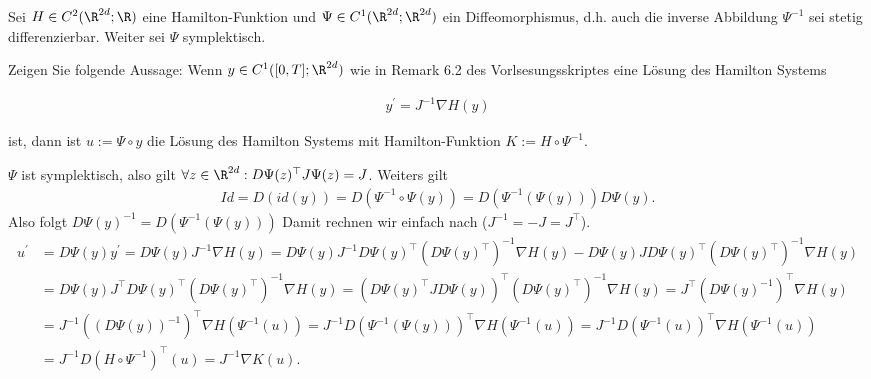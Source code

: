 \begin{exercise}
  Sei $H \in C^2(\R^{2d};\R)$ eine Hamilton-Funktion und
  $\Psi \in C^1(\R^{2d};\R^{2d})$ ein Diffeomorphismus,
  d.h. auch die inverse Abbildung $\Psi^{-1}$ sei stetig
  differenzierbar. Weiter sei $\Psi$ symplektisch.

  Zeigen Sie folgende Aussage: Wenn $y \in C^1([0,T];\R^{2d})$
  wie in Remark 6.2 des Vorlsesungsskriptes eine Lösung des
  Hamilton Systems

  \begin{align}
    y^\prime = J^{-1}\nabla H(y)
  \end{align}

  ist, dann ist $u := \Psi \circ y$ die Lösung des Hamilton
  Systems mit Hamilton-Funktion $K := H \circ \Psi^{-1}$.
\end{exercise}

\begin{solution}
  $\Psi$ ist symplektisch, also gilt $\forall z \in \R^{2d}: D\Psi(z)^{\top}J\Psi(z) = J$.
  Weiters gilt
  \begin{align*}
    Id = D(id(y)) = D(\Psi^{-1} \circ \Psi(y)) = D(\Psi^{-1}(\Psi(y)))D\Psi(y).
  \end{align*}
  Also folgt $D\Psi(y)^{-1} =  D(\Psi^{-1}(\Psi(y)))$
  Damit rechnen wir einfach nach ($J^{-1} = -J = J^{\top}$).
  \begin{align*}
    u^{\prime} &= D \Psi(y)y^{\prime} = D\Psi(y)J^{-1}\nabla H(y) =  D\Psi(y)J^{-1}D\Psi(y)^{\top}(D\Psi(y)^{\top})^{-1}\nabla H(y)
    -D\Psi(y)JD\Psi(y)^{\top}(D\Psi(y)^{\top})^{-1}\nabla H(y) \\
    &= D\Psi(y)J^{\top}D\Psi(y)^{\top}(D\Psi(y)^{\top})^{-1}\nabla H(y)
    = (D\Psi(y)^{\top}JD\Psi(y))^{\top}(D\Psi(y)^{\top})^{-1}\nabla H(y)
    = J^{\top}(D\Psi(y)^{-1})^{\top}\nabla H(y) \\
    &= J^{-1}((D\Psi(y))^{-1})^{\top}\nabla H(\Psi^{-1}(u))
    = J^{-1}D(\Psi^{-1}(\Psi(y)))^{\top}\nabla H(\Psi^{-1}(u)) =
    J^{-1}D(\Psi^{-1}(u))^{\top}\nabla H(\Psi^{-1}(u)) \\
    &= J^{-1}D(H \circ \Psi^{-1})^{\top}(u) =  J^{-1}\nabla K(u).
  \end{align*}

\end{solution}
